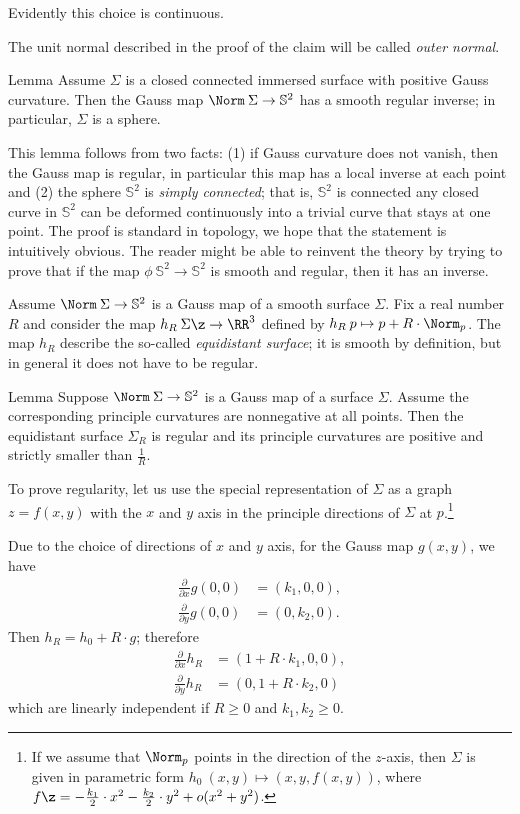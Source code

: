 Evidently this choice is  continuous.
\qeds

The unit normal described in the proof of the claim will be called \emph{outer normal}.

\begin{thm}{Lemma}\label{lem:gauss-inverse}
Assume $\Sigma$ is a closed connected immersed surface with positive Gauss curvature.
Then the Gauss map $\Norm\:\Sigma \to \mathbb{S}^2$ has a smooth regular inverse;
in particular, $\Sigma$ is a sphere.
\end{thm}

This lemma follows from two facts:
(1) if Gauss curvature does not vanish, then the  Gauss map is regular, in particular this map has a local inverse at each point
and
(2) the sphere $\mathbb{S}^2$ is \emph{simply connected};
that is, $\mathbb{S}^2$ is connected any closed curve in $\mathbb{S}^2$ can be deformed continuously into a trivial curve that stays at one point.
The proof is standard in topology, we hope that the statement is intuitively obvious.
The reader might be able to reinvent the theory by trying to prove that if the map $\phi\:\mathbb{S}^2\to\mathbb{S}^2$ is smooth and regular, then it has an inverse.

Assume $\Norm\:\Sigma\to \mathbb{S}^2$ is a Gauss map of a smooth surface $\Sigma$.
Fix a real number $R$ and consider the map $h_R\:\Sigma\z\to\RR^3$ defined by $h_R\:p\mapsto p+R\cdot\Norm_p$.
The map $h_R$ describe the so-called \emph{equidistant surface};
it is smooth by definition, but in general it does not have to be regular.

\begin{thm}{Lemma}\label{lem:curc<1/R}
Suppose $\Norm\:\Sigma\to \mathbb{S}^2$ is a Gauss map of a surface $\Sigma$.
Assume the corresponding principle curvatures are nonnegative at all points. 
Then the equidistant surface $\Sigma_R$ is regular and its principle curvatures are positive and strictly smaller than $\tfrac1R$.
\end{thm}

To prove regularity, let us use the special representation of $\Sigma$ as a graph $z=f(x,y)$ with the $x$ and $y$ axis in the principle directions of $\Sigma$ at $p$.\footnote{If we assume that $\Norm_p$ points in the direction of the $z$-axis, then $\Sigma$ is given in parametric form 
$h_0\:(x,y)\mapsto (x,y,f(x,y))$,
where $f\z=-\tfrac{k_1}2\cdot x^2-\tfrac{k_2}2\cdot y^2+o(x^2+y^2)$.}

Due to the choice of directions of $x$ and $y$ axis,
for the Gauss map $g(x,y)$, we have 
\begin{align*}
\tfrac{\partial}{\partial x}g(0,0)&=(k_1,0,0),
\\
\tfrac{\partial}{\partial y}g(0,0)&=(0,k_2,0).
\end{align*}
Then $h_R=h_0+R\cdot g$; therefore
\begin{align*}
\tfrac{\partial}{\partial x} h_R&=(1+R\cdot k_1,0,0),
\\
\tfrac{\partial}{\partial y} h_R&=(0,1+R\cdot k_2,0)
\end{align*}
which are linearly independent if $R\ge0$ and $k_1,k_2\ge 0$. 

